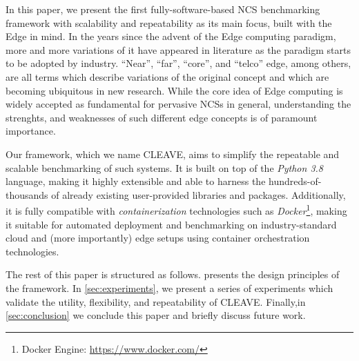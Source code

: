 In this paper, we present the first fully-software-based \ac{NCS} benchmarking framework with scalability and repeatability as its main focus, built with the Edge in mind.
In the years since the advent of the Edge computing paradigm, more and more variations of it have appeared in literature as the paradigm starts to be adopted by industry.
``Near'', ``far'', ``core'', and ``telco'' edge, among others, are all terms which describe variations of the original concept and which are becoming ubiquitous in new research.
While the core idea of Edge computing is widely accepted as fundamental for pervasive \acp{NCS} in general, understanding the strenghts, and weaknesses of such different edge concepts is of paramount importance.

Our framework, which we name \ac{CLEAVE}, aims to simplify the repeatable and scalable benchmarking of such systems. 
It is built on top of the \emph{Python 3.8} language, making it highly extensible and able to harness the hundreds-of-thousands of already existing user-provided libraries and packages.
Additionally, it is fully compatible with \emph{containerization} technologies such as \emph{Docker}\footnote{Docker Engine: \url{https://www.docker.com/}}, making it suitable for automated deployment and benchmarking on industry-standard cloud and (more importantly) edge setups using container orchestration technologies.

The rest of this paper is structured as follows.
 presents the design principles of the framework.
In \cref{sec:experiments}, we present a series of experiments which validate the utility, flexibility, and repeatability of \ac{CLEAVE}.
Finally,in \cref{sec:conclusion} we conclude this paper and briefly discuss future work.